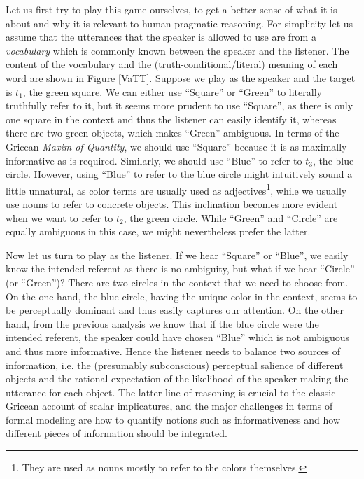 Let us first try to play this game ourselves, to get a better sense of what it is about and why it is relevant to human pragmatic reasoning. For simplicity let us assume that the utterances that the speaker is allowed to use are from a \emph{vocabulary} which is commonly known between the speaker and the listener. The content of the vocabulary and the (truth-conditional/literal) meaning of each word are shown in Figure \ref{VaTT}. Suppose we play as the speaker and the target is $t_1$, the green square. We can either use ``Square'' or ``Green'' to literally truthfully refer to it, but it seems more prudent to use ``Square'', as there is only one square in the context and thus the listener can easily identify it, whereas there are two green objects, which makes ``Green'' ambiguous. In terms of the Gricean \emph{Maxim of Quantity}, we should use ``Square'' because it is as maximally informative as is required. Similarly, we should use ``Blue'' to refer to $t_3$, the blue circle. However,  using ``Blue'' to refer to the blue circle might intuitively sound a little unnatural, as color terms are usually used as adjectives\footnote{They are used as nouns mostly to refer to the colors themselves.}, while we usually use nouns to refer to concrete objects. This inclination becomes more evident when we want to refer to $t_2$, the green circle. While ``Green'' and ``Circle'' are equally ambiguous in this case, we might nevertheless prefer the latter. 

Now let us turn to play as the listener. If we hear ``Square'' or ``Blue'', we easily know the intended referent as there is no ambiguity, but what if we hear ``Circle'' (or ``Green'')? There are two circles in the context that we need to choose from. On the one hand, the blue circle, having the unique color in the context, seems to be perceptually dominant and thus easily captures our attention. On the other hand, from the previous analysis we know that if the blue circle were the intended referent, the speaker could have chosen ``Blue'' which is not ambiguous and thus more informative. Hence the listener needs to balance two sources of information, i.e. the (presumably subconscious) perceptual salience of different objects and the rational expectation of the likelihood of the speaker making the utterance for each object. The latter line of reasoning is crucial to the classic Gricean account of scalar implicatures, and the major challenges in terms of formal modeling are how to quantify  notions such as informativeness and how different pieces of information should be integrated.

